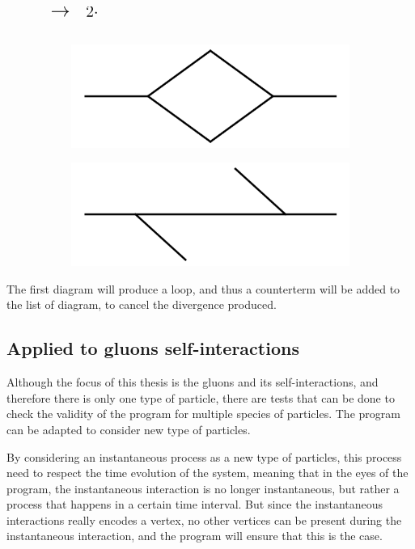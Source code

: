 \documentclass[11pt,a4paper,twoside,pdf]{article}
\numberwithin{equation}{section}
\begin{document}
\begin{figure}[h!]
\begin{subfigure}[t]{.1\textwidth}
    \end{subfigure}%
    $\displaystyle \quad %
    \raisebox{1.8\height}{\LARGE $\to$} $
    $\displaystyle \quad %
    \raisebox{1.2\height}{\Large $2\cdot$} $
    \begin{subfigure}[t]{.2\textwidth}
    \includegraphics[width=\textwidth]{plots/1to1_1.png}
    \end{subfigure}%
    \raisebox{1.3\height}{\Large $+$}\quad
    \raisebox{1.2\height}{\Large $4\cdot$}
    \begin{subfigure}[t]{.2\textwidth}
    \includegraphics[width=\textwidth]{plots/1to1_2.png}
    \end{subfigure}%
\end{figure}

The first diagram will produce a loop, and thus a counterterm will be added to the
list of diagram, to cancel the divergence produced.

\subsection{Applied to gluons self-interactions} \label{sec:applied_gluons}
Although the focus of this thesis is the gluons and its self-interactions, 
and therefore there is only one type of particle, there are tests that can be done to 
check the validity of the program for multiple species of particles.
The program can be adapted to consider new type of particles.

By considering an instantaneous 
process as a new type of particles, this process need to respect the time 
evolution of the system, meaning that in the eyes of the program, the 
instantaneous interaction is no longer instantaneous, but rather a process that
happens in a certain time interval. But since the instantaneous interactions 
really encodes a vertex, no other vertices can be present during the instantaneous
interaction, and the program will ensure that this is the case.
\end{document}
